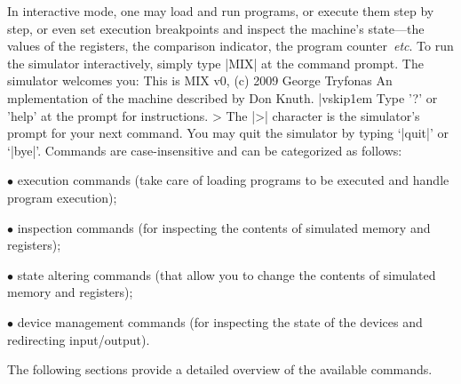 In interactive mode, one may load and run programs, or execute them
step by step, or even set execution breakpoints and inspect the
machine's state---the values of the registers, the comparison indicator,
the program counter~{\sl etc}. To run the simulator interactively,
simply type |MIX| at the command prompt. The simulator welcomes
you:
\begintt
This is MIX v0, (c) 2009 George Tryfonas
An mplementation of the machine described by Don Knuth.
|vskip1em
Type '?' or 'help' at the prompt for instructions.
>
\endtt
The |>| character is the simulator's prompt for your next command.
You may quit the simulator by typing `|quit|' or `|bye|'.
Commands are case-insensitive and can be categorized as follows:
\smallskip
\item{$\bullet$} execution commands (take care of loading programs
to be executed and handle program execution);
\item{$\bullet$} inspection commands (for inspecting the contents
of simulated memory and registers);
\item{$\bullet$} state altering commands (that allow you to change
the contents of simulated memory and registers);
\item{$\bullet$} device management commands (for inspecting the state
of the devices and redirecting input\slash output).

\smallskip\noindent
The following sections provide a detailed overview of the
available commands.

